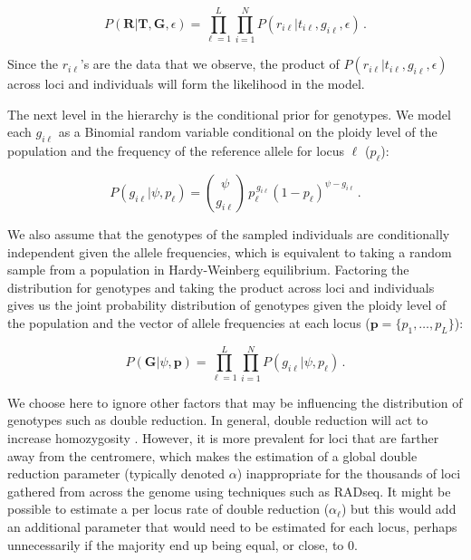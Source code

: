 \documentclass[11pt,english,letterpaper,oneside]{article}
\begin{document}
\begin{equation}\label{factored_lik}
P(\bm{R}|\bm{T},\bm{G}, \epsilon) = \displaystyle\prod_{\ell=1}^L\displaystyle\prod_{i=1}^N P(r_{i \ell}|t_{i \ell},g_{i \ell}, \epsilon)\,.
\end{equation}

\noindent Since the $r_{i \ell}$'s are the data that we observe, the product of $P(r_{i \ell}|t_{i\ell}, g_{i \ell},\epsilon)$ across loci and individuals will form the likelihood in the model.
\medskip

The next level in the hierarchy is the conditional prior for genotypes. We model each $g_{i \ell}$ as a Binomial random variable conditional on the ploidy level of the population and the frequency of the reference allele for locus $\ell$ ($p_{\ell}$):

\begin{equation*}
P(g_{i \ell}|\psi,p_{\ell}) = \binom{\psi}{g_{i \ell}}\,p_{\ell}^{\,g_{i \ell}}(1-p_{\ell})^{\psi-g_{i \ell}}\,.
\end{equation*}

\noindent We also assume that the genotypes of the sampled individuals are conditionally independent given the allele frequencies, which is equivalent to taking a random sample from a population in Hardy-Weinberg equilibrium. Factoring the distribution for genotypes and taking the product across loci and individuals gives us the joint probability distribution of genotypes given the ploidy level of the population and the vector of allele frequencies at each locus ($\bm{p}=\{p_1,\ldots,p_L\}$):

\begin{equation}\label{condl_prior}
P(\bm{G}|\psi, \bm{p}) = \displaystyle\prod_{\ell=1}^L\displaystyle\prod_{i=1}^N P(g_{i \ell}|\psi, p_{\ell})\,.
\end{equation}

\noindent We choose here to ignore other factors that may be influencing the distribution of genotypes such as double reduction. In general, double reduction will act to increase homozygosity \citep{hardy2015autopolyploids}. However, it is more prevalent for loci that are farther away from the centromere, which makes the estimation of a global double reduction parameter (typically denoted $\alpha$) inappropriate for the thousands of loci gathered from across the genome using techniques such as RADseq. It might be possible to estimate a per locus rate of double reduction ($\alpha_{\ell}$) but this would add an additional parameter that would need to be estimated for each locus, perhaps unnecessarily if the majority end up being equal, or close, to 0.
\medskip
\end{document}
